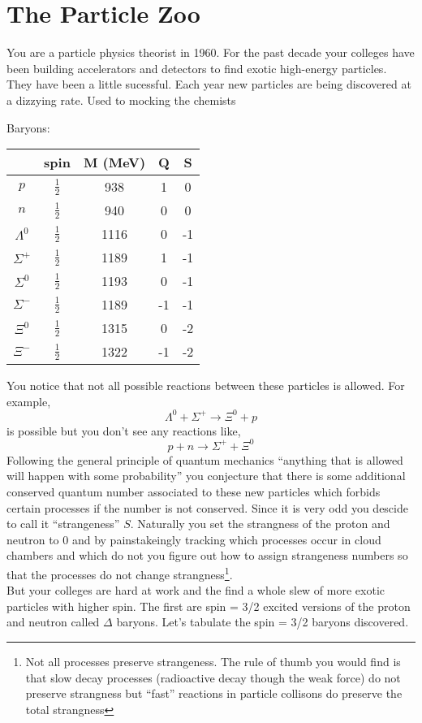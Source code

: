 \documentclass[12pt]{article}
\begin{document}
\section{The Particle Zoo}

You are a particle physics theorist in 1960. For the past decade your colleges have been building accelerators and detectors to find exotic high-energy particles. They have been a little sucessful. Each year new particles are being discovered at a dizzying rate. Used to mocking the chemists 

Baryons:


\renewcommand{\arraystretch}{1.30}

\begin{center}
\begin{tabular}{||c | c c c c ||} 
 \hline
 & spin & M (MeV) & Q & S \\ [0.5ex] 
 \hline\hline
$p$ & $\tfrac{1}{2}$ & 938 & 1 & 0 \\ 
 \hline
$n$ & $\tfrac{1}{2}$ & 940 & 0 & 0 \\ 
 \hline
$\Lambda^0$ & $\tfrac{1}{2}$ & 1116 & 0 & -1 \\ 
 \hline
$\Sigma^+$ & $\tfrac{1}{2}$ & 1189 & 1 & -1 \\ 
 \hline
$\Sigma^0$ & $\tfrac{1}{2}$ & 1193 & 0 & -1 \\ 
 \hline
$\Sigma^{-}$ & $\tfrac{1}{2}$ & 1189 & -1 & -1 \\ 
 \hline
$\Xi^0$ & $\tfrac{1}{2}$ & 1315 & 0 & -2 \\ 
 \hline
$\Xi^{-}$ & $\tfrac{1}{2}$ & 1322 & -1 & -2 \\ 
 \hline
\end{tabular}
\end{center}

You notice that not all possible reactions between these particles is allowed. For example,
\[ \Lambda^0 + \Sigma^+ \to \Xi^0 + p \]
is possible but you don't see any reactions like,
\[ p + n \to \Sigma^+ + \Xi^0 \]
Following the general principle of quantum mechanics ``anything that is allowed will happen with some probability'' you conjecture that there is some additional conserved quantum number associated to these new particles which forbids certain processes if the number is not conserved. Since it is very odd you descide to call it ``strangeness'' $S$. Naturally you set the strangness of the proton and neutron to $0$ and by painstakeingly tracking which processes occur in cloud chambers and which do not you figure out how to assign strangeness numbers so that the processes do not change strangness\footnote{Not all processes preserve strangeness. The rule of thumb you would find is that slow decay processes (radioactive decay though the weak force) do not preserve strangness but ``fast'' reactions in particle collisons do preserve the total strangness}.
\\
But your colleges are hard at work and the find a whole slew of more exotic particles with higher spin. The first are spin = 3/2 excited versions of the proton and neutron called $\Delta$ baryons. Let's tabulate the spin = 3/2 baryons discovered.
\end{document}
